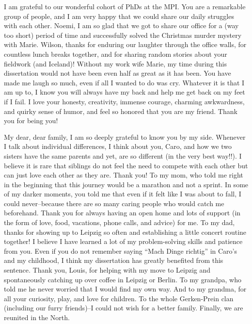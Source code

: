 \documentclass[
]{scrbook}
\begin{document}
I am grateful to our wonderful cohort of PhDs at the MPI. You are a remarkable group of people, and I am very happy that we could share our daily struggles with each other. Noemi, I am so glad that we got to share our office for a (way too short) period of time and successfully solved the Christmas murder mystery with Marie. Wilson, thanks for enduring our laughter through the office walls, for countless lunch breaks together, and for sharing random stories about your fieldwork (and Iceland)! Without my work wife Marie, my time during this dissertation would not have been even half as great as it has been. You have made me laugh so much, even if all I wanted to do was cry. Whatever it is that I am up to, I know you will always have my back and help me get back on my feet if I fail. I love your honesty, creativity, immense courage, charming awkwardness, and quirky sense of humor, and feel so honored that you are my friend. Thank you for being you!

My dear, dear family, I am so deeply grateful to know you by my side. Whenever I talk about individual differences, I think about you, Caro, and how we two sisters have the same parents and yet, are so different (in the very best way!!). I believe it is rare that siblings do not feel the need to compete with each other but can just love each other as they are. Thank you! To my mom, who told me right in the beginning that this journey would be a marathon and not a sprint. In some of my darker moments, you told me that even if it felt like I was about to fall, I could never\thinspace --\thinspace because there are so many caring people who would catch me beforehand. Thank you for always having an open home and lots of support (in the form of love, food, vacations, phone calls, and advice) for me. To my dad, thanks for showing up to Leipzig so often and establishing a little concert routine together! I believe I have learned a lot of my problem-solving skills and patience from you. Even if you do not remember saying ``Mach Dinge richtig'' in Caro's and my childhood, I think my dissertation has greatly benefited from this sentence. Thank you, Louis, for helping with my move to Leipzig and spontaneously catching up over coffee in Leipzig or Berlin. To my grandpa, who told me he never worried that I would find my own way. And to my grandma, for all your curiosity, play, and love for children. To the whole Gerken-Prein clan (including our furry friends)\thinspace --\thinspace I could not wish for a better family. Finally, we are reunited in the North.
\end{document}
